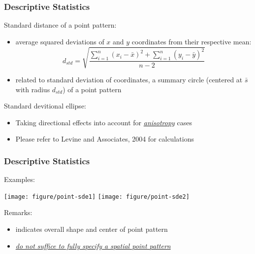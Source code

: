 \documentclass[10pt]{beamer}\usepackage[]{graphicx}\usepackage[]{color}
\newenvironment{knitrout}{}{} %
\newcommand{\bitemize}{\begin{itemize}}
\newcommand{\eitemize}{\end{itemize}}
\newcommand{\bblock}{\begin{block}}
\newcommand{\eblock}{\end{block}}
\begin{document}
\begin{frame}
\frametitle{Descriptive Statistics}

\bblock{Standard distance of a point pattern:}
\begin{itemize}
\item average squared deviations of $x$ and $y$ coordinates from their respective mean:
\begin{equation*}
d_{std} = \sqrt{\frac{\sum_{i=1}^{n}(x_i-\bar{x})^2+\sum_{i=1}^{n}(y_i-\bar{y})^2}{n-2}}
\end{equation*}

\item related to standard deviation of coordinates, a summary circle (centered at $\bar{s}$ with radius $d_{std}$) of a point pattern
\end{itemize}
\eblock

\bblock{Standard devitional ellipse:}
\bitemize
\item Taking directional effects into account for \underline{\it anisotropy} cases
\item Please refer to Levine and Associates, 2004 for calculations
\eitemize
\eblock

\end{frame}

\begin{frame}
\frametitle{Descriptive Statistics}

\bblock{Examples:}

\begin{knitrout}
\color{fgcolor}

{\centering \texttt{[image: figure/point-sde1]} 
\texttt{[image: figure/point-sde2]} 

}



\end{knitrout}

\eblock

\bblock{Remarks:}
\bitemize
\item indicates overall shape and center of point pattern
\item \underline{\it do not suffice to fully specify a spatial point pattern}
\eitemize
\eblock
\end{frame}
\end{document}
